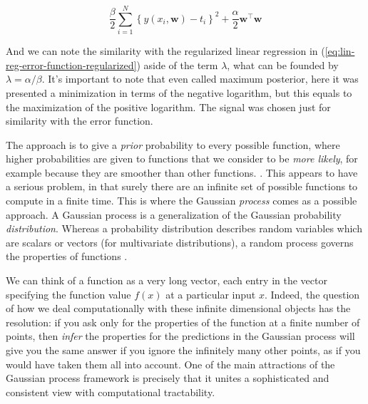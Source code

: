 \documentclass[11pt]{article} %
\begin{document}
\begin{equation}
    \frac{\beta}{2} \sum_{i=1}^{N}\left\{y\left(x_{i}, \mathbf{w}\right)-t_{i}\right\}^{2} + \frac{\alpha}{2} \mathbf{w}^\top \mathbf{w}
\end{equation}

And we can note the similarity with the regularized linear regression in (\ref{eq:lin-reg-error-function-regularized}) aside of the term $\lambda$, what can be founded by $\lambda=\alpha / \beta$. It's important to note that even called maximum posterior, here it was presented a minimization in terms of the negative logarithm, but this equals to the maximization of the positive logarithm. The signal was chosen just for similarity with the error function.



The approach is to give a \textit{prior} probability to every possible function, where higher probabilities are given to functions that we consider to be \textit{more likely}, for example because they are smoother than other functions. \cite{Rasmussen:2005:GPM:1162254}. This appears to have a serious problem, in that surely there are an infinite set of possible functions to compute in a finite time. This is where the Gaussian \textit{process} comes as a possible approach. 
A Gaussian process is a generalization of the Gaussian probability \textit{distribution}. Whereas a probability distribution describes random variables which are scalars or vectors (for multivariate distributions), a random process governs the properties of functions \cite{getoor2009}. 

We can think of a function as a very long vector, each entry in the vector specifying the function value $f(x)$ at a particular input $x$. Indeed, the question of how we deal computationally with these infinite dimensional objects has the resolution: if you ask only for the properties of the function at a finite number of points, then \textit{infer} the properties for the predictions in the Gaussian process will give you the same answer if you ignore the infinitely many other points, as if you would have taken them all into account. One of the main attractions of the Gaussian process framework is precisely that it unites a sophisticated and consistent view with computational tractability.
\end{document}
